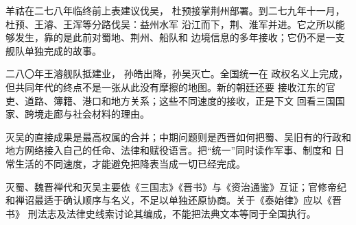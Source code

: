 羊祜在二七八年临终前上表建议伐吴，
杜预接掌荆州部署。到二七九年十一月，
杜预、王濬、王浑等分路伐吴：益州水军
沿江而下，荆、淮军并进。它之所以能够发生，靠的是此前对蜀地、荆州、船队和
边境信息的多年接收；它仍不是一支舰队单独完成的故事。

二八〇年王濬舰队抵建业，
孙皓出降，孙吴灭亡。全国统一在
政权名义上完成，但共同年代的终点不是一张从此没有摩擦的地图。新的朝廷还要
接收江东的官吏、道路、簿籍、港口和地方关系；这些不同速度的接收，正是下文
回看三国国家、跨境走廊与社会材料的理由。

\begin{turningpoint}[二八〇年的终点]
灭吴的直接成果是最高权属的合并；中期问题则是西晋如何把蜀、吴旧有的行政和
地方网络接入自己的任命、法律和赋役语言。把“统一”同时读作军事、制度和
日常生活的不同速度，才能避免把降表当成一切已经完成。
\end{turningpoint}

\begin{sourcenote}[征服、禅代与法律的证据]
灭蜀、魏晋禅代和灭吴主要依《三国志》《晋书》与《资治通鉴》互证；官修帝纪
和禅诏最适于确认顺序与名义，不足以单独还原协商。关于《泰始律》应以《晋书》
刑法志及法律史线索讨论其编成，不能把法典文本等同于全国执行。
\end{sourcenote}

